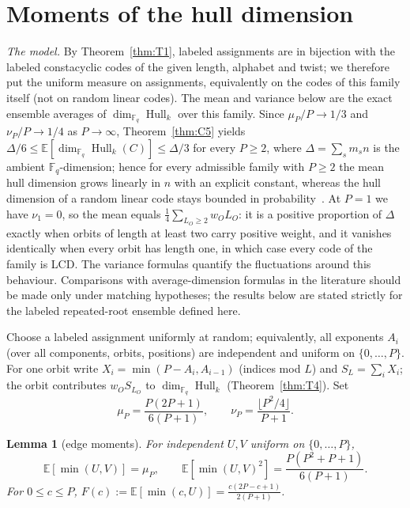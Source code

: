 \documentclass[10pt,journal,draftclsnofoot,onecolumn]{IEEEtran}
\newtheorem{lemma}[theorem]{Lemma}
\theoremstyle{definition}
\theoremstyle{remark}
\newcommand{\Fq}{\mathbb{F}_q}
\newcommand{\Hull}{\operatorname{Hull}}
\newcommand{\E}{\mathbb{E}}
\begin{document}
\section{Moments of the hull dimension}\label{sec:moments}

\emph{The model.} By Theorem~\ref{thm:T1}, labeled assignments are in
bijection with the labeled constacyclic codes of the given length,
alphabet and twist; we therefore put the uniform measure on assignments,
equivalently on the codes of this family itself (not on random linear
codes). The mean and variance below are the exact ensemble averages of
\(\dim_{\Fq}\Hull_k\) over this family. Since
\(\mu_P / P \to 1/3\) and \(\nu_P / P \to 1/4\) as \(P \to \infty\),
Theorem~\ref{thm:C5} yields
\(\Delta/6 \le \E[\dim_{\Fq}\Hull_k(C)] \le \Delta/3\) for every
\(P \ge 2\), where \(\Delta = \sum_s m_s n\) is the ambient
\(\Fq\)-dimension; hence for every admissible family with \(P \ge 2\)
the mean hull dimension grows linearly in \(n\) with an explicit
constant, whereas the hull dimension of a random linear code stays
bounded in probability~\cite{Sendrier1997}. At \(P = 1\) we have
\(\nu_1 = 0\), so the mean equals \(\tfrac14 \sum_{L_O \ge 2} w_O L_O\):
it is a positive proportion of \(\Delta\) exactly when orbits of length
at least two carry positive weight, and it vanishes identically when
every orbit has length one, in which case every code of the family is
LCD. The variance formulas quantify the
fluctuations around this behaviour. Comparisons with average-dimension formulas in the literature
should be made only under matching hypotheses; the results below are
stated strictly for the labeled repeated-root ensemble defined here.

Choose a labeled assignment uniformly at random; equivalently, all
exponents \(A_i\) (over all components, orbits, positions) are
independent and uniform on \(\{0,\dots,P\}\). For one orbit write
\(X_i = \min(P-A_i, A_{i-1})\) (indices mod \(L\)) and
\(S_L = \sum_i X_i\); the orbit contributes \(w_O S_{L_O}\) to
\(\dim_{\Fq}\Hull_k\) (Theorem~\ref{thm:T4}). Set
\[
\mu_P = \frac{P(2P+1)}{6(P+1)},
\qquad
\nu_P = \frac{\lfloor P^2/4 \rfloor}{P+1}.
\]

\begin{lemma}[edge moments]\label{lem:edge}
For independent \(U, V\) uniform on \(\{0,\dots,P\}\),
\[
\E[\min(U,V)] = \mu_P,
\qquad
\E[\min(U,V)^2] = \frac{P(P^2+P+1)}{6(P+1)} .
\]
For \(0 \le c \le P\),
\(F(c) := \E[\min(c,U)] = \frac{c(2P-c+1)}{2(P+1)}\).
\end{lemma}
\end{document}
